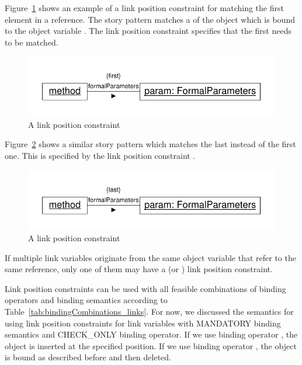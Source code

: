 {Figure~\ref{fig:linkPositionConstraintFirst} shows an example of a link position constraint for matching the first element in a reference. The story pattern matches a  of the object which is bound to the object variable . The link position constraint  specifies that the first  needs to be matched.

\begin{figure}[htbp]
\center
\includegraphics[width=0.75\columnwidth]{figures/LinkPositionConstraintFirst}
\caption{A  link position constraint}
\label{fig:linkPositionConstraintFirst}
\end{figure}

Figure~\ref{fig:linkPositionConstraintLast} shows a similar story pattern which matches the last  instead of the first one. This is specified by the link position constraint .

\begin{figure}[htbp]
\center
\includegraphics[width=0.75\columnwidth]{figures/LinkPositionConstraintLast}
\caption{A  link position constraint}
\label{fig:linkPositionConstraintLast}
\end{figure}

If multiple link variables originate from the same object variable that refer to the same reference, only one of them may have a  (or ) link position constraint.

Link position constraints can be used with all feasible combinations of binding operators and binding semantics according to Table~\ref{tab:bindingCombinations_links}. For now, we discussed the semantics for using link position constraints for link variables with MANDATORY binding semantics and CHECK\_ONLY binding operator. If we use binding operator \create, the object is inserted at the specified position. If we use binding operator \destroy, the object is bound as described before and then deleted.

}
